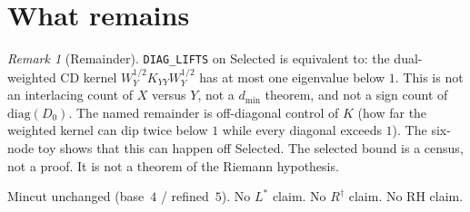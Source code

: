\documentclass[11pt]{article}
\theoremstyle{remark}
\newtheorem{remark}{Remark}
\begin{document}
\section{What remains}

\begin{remark}[Remainder]
\texttt{DIAG\_LIFTS} on Selected is equivalent to:
the dual-weighted CD kernel $W_Y^{1/2}K_{YY}W_Y^{1/2}$
has at most one eigenvalue below $1$.
This is not an interlacing count of $X$ versus $Y$,
not a $d_{\min}$ theorem, and not a sign count of
$\mathrm{diag}(D_0)$.
The named remainder is off-diagonal control of $K$
(how far the weighted kernel can dip twice below $1$
while every diagonal exceeds $1$).
The six-node toy shows that this can happen off Selected.
The selected bound is a census, not a proof.
It is not a theorem of the Riemann hypothesis.
\end{remark}

Mincut unchanged (base~$4$ / refined~$5$).
No $L^*$ claim.  No $R^\dagger$ claim.  No RH claim.
\end{document}
